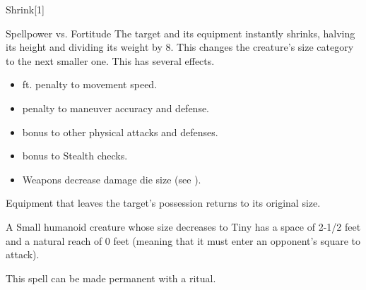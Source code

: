 \begin{spellsection}{Shrink}[1]
    \begin{spellheader}
    \end{spellheader}
    \begin{spellcontent}
        \begin{spelltargetinginfo}
        \end{spelltargetinginfo}
        \begin{spelleffects}
            \begin{spellattack}{Spellpower vs. Fortitude}
                \spellsuccess The target and its equipment instantly shrinks, halving its height and dividing its weight by 8. This changes the creature's size category to the next smaller one. This has several effects.
                \begin{itemize}
                    \item {} ft. penalty to movement speed.
                    \item {} penalty to maneuver accuracy and defense.
                    \item {} bonus to other physical attacks and defenses.
                    \item {} bonus to Stealth checks.
                    \item Weapons decrease damage die size (see ).
                \end{itemize}
                \par Equipment that leaves the target's possession returns to its original size.
            \end{spellattack}
            \spelldur \durshort \dismissable
        \end{spelleffects}
    \end{spellcontent}
    \begin{spellfooter}
        \spellnotes A Small humanoid creature whose size decreases to Tiny has a space of 2-1/2 feet and a natural reach of 0 feet (meaning that it must enter an opponent's square to attack).

        \sizingspellnotes This spell can be made permanent with a  ritual.
        \miscastrandom
    \end{spellfooter}
\end{spellsection}

